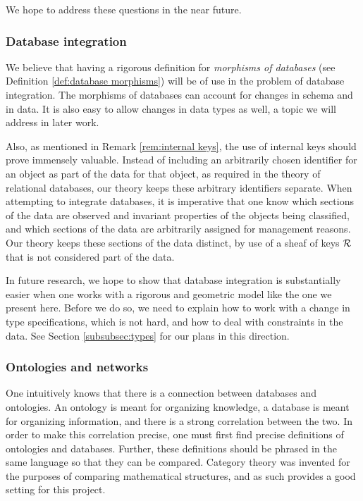 \documentclass{amsart}
\begin{document}
We hope to address these questions in the near future.

\subsubsection{Database integration}

We believe that having a rigorous definition for {\em morphisms of databases} (see Definition \ref{def:database morphisms}) will be of use in the problem of database integration.  The morphisms of databases can account for changes in schema and in data.  It is also easy to allow changes in data types as well, a topic we will address in later work.

Also, as mentioned in Remark \ref{rem:internal keys}, the use of internal keys should prove immensely valuable.  Instead of including an arbitrarily chosen identifier for an object as part of the data for that object, as required in the theory of relational databases, our theory keeps these arbitrary identifiers separate.  When attempting to integrate databases, it is imperative that one know which sections of the data are observed and invariant properties of the objects being classified, and which sections of the data are arbitrarily assigned for management reasons.  Our theory keeps these sections of the data distinct, by use of a sheaf of keys $\mathcal{R}$ that is not considered part of the data.

In future research, we hope to show that database integration is substantially easier when one works with a rigorous and geometric model like the one we present here.  Before we do so, we need to explain how to work with a change in type specifications, which is not hard, and how to deal with constraints in the data.  See Section \ref{subsubsec:types} for our plans in this direction.

\subsubsection{Ontologies and networks}

One intuitively knows that there is a connection between databases and ontologies.  An ontology is meant for organizing knowledge, a database is meant for organizing information, and there is a strong correlation between the two.  In order to make this correlation precise, one must first find precise definitions of ontologies and databases.  Further, these definitions should be phrased in the same language so that they can be compared.  Category theory was invented for the purposes of comparing mathematical structures, and as such provides a good setting for this project.
\end{document}
